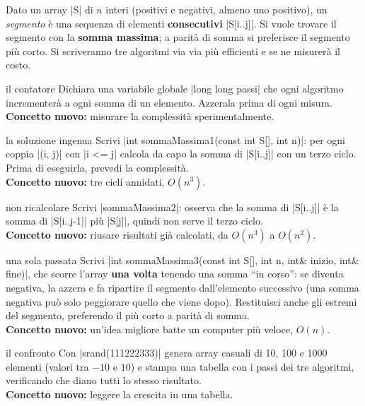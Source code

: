 \begin{traccia}
Dato un array \cc|S| di $n$ interi (positivi e negativi, almeno uno positivo), un
\emph{segmento} è una sequenza di elementi \textbf{consecutivi} \cc|S[i..j]|. Si vuole
trovare il segmento con la \textbf{somma massima}; a parità di somma si preferisce il
segmento più corto. Si scriveranno tre algoritmi via via più efficienti e se ne
misurerà il costo.
\end{traccia}

\begin{step}{il contatore}
Dichiara una variabile globale \cc|long long passi| che ogni algoritmo incrementerà
a ogni somma di un elemento. Azzerala prima di ogni misura.\\[0.3em]
\textbf{Concetto nuovo:} misurare la complessità sperimentalmente.
\end{step}

\begin{step}{la soluzione ingenua}
Scrivi \cc|int sommaMassima1(const int S[], int n)|: per ogni coppia \cc|(i, j)| con
\cc|i <= j| calcola da capo la somma di \cc|S[i..j]| con un terzo ciclo. Prima di
eseguirla, prevedi la complessità.\\[0.3em]
\textbf{Concetto nuovo:} tre cicli annidati, $O(n^3)$.
\end{step}

\begin{step}{non ricalcolare}
Scrivi \cc|sommaMassima2|: osserva che la somma di \cc|S[i..j]| è la somma di
\cc|S[i..j-1]| più \cc|S[j]|, quindi non serve il terzo ciclo.\\[0.3em]
\textbf{Concetto nuovo:} riusare risultati già calcolati, da $O(n^3)$ a $O(n^2)$.
\end{step}

\begin{step}{una sola passata}
Scrivi \cc|int sommaMassima3(const int S[], int n, int& inizio, int& fine)|, che
scorre l'array \textbf{una volta} tenendo una somma ``in corso'': se diventa negativa,
la azzera e fa ripartire il segmento dall'elemento successivo (una somma negativa
può solo peggiorare quello che viene dopo). Restituisci anche gli estremi del
segmento, preferendo il più corto a parità di somma.\\[0.3em]
\textbf{Concetto nuovo:} un'idea migliore batte un computer più veloce, $O(n)$.
\end{step}

\begin{step}{il confronto}
Con \cc|srand(111222333)| genera array casuali di 10, 100 e 1000 elementi (valori
tra $-10$ e $10$) e stampa una tabella con i passi dei tre algoritmi, verificando che
diano tutti lo stesso risultato.\\[0.3em]
\textbf{Concetto nuovo:} leggere la crescita in una tabella.
\end{step}

